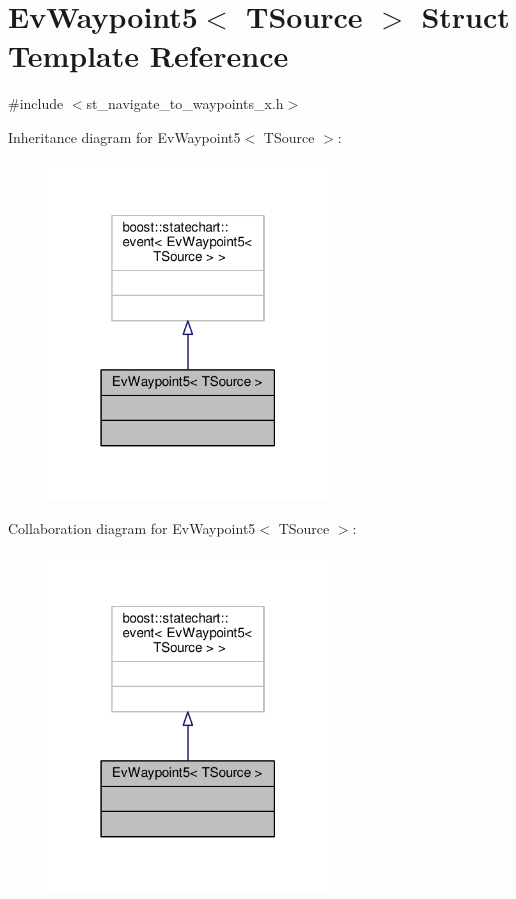 \hypertarget{structEvWaypoint5}{}\section{Ev\+Waypoint5$<$ T\+Source $>$ Struct Template Reference}
\label{structEvWaypoint5}


{\ttfamily \#include $<$st\+\_\+navigate\+\_\+to\+\_\+waypoints\+\_\+x.\+h$>$}



Inheritance diagram for Ev\+Waypoint5$<$ T\+Source $>$\+:
\nopagebreak
\begin{figure}[H]
\begin{center}
\leavevmode
\includegraphics[width=210pt]{structEvWaypoint5__inherit__graph}
\end{center}
\end{figure}


Collaboration diagram for Ev\+Waypoint5$<$ T\+Source $>$\+:
\nopagebreak
\begin{figure}[H]
\begin{center}
\leavevmode
\includegraphics[width=210pt]{structEvWaypoint5__coll__graph}
\end{center}
\end{figure}


